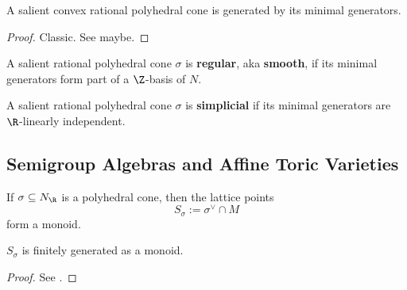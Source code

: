 \begin{lemma}
  \label{1-2-15-cone-hull-min-gen}

  A salient convex rational polyhedral cone is generated by its minimal generators.
\end{lemma}
\begin{proof}

  Classic. See \cite{Oda_1988} maybe.
\end{proof}


\begin{definition}
  \label{1-2-16-reg-cone}

  A salient rational polyhedral cone $\sigma$ is {\bf regular}, aka {\bf smooth}, if its minimal generators form part of a $\Z$-basis of $N$.
\end{definition}


\begin{definition}
  \label{1-2-16-simplicial-cone}

  A salient rational polyhedral cone $\sigma$ is {\bf simplicial} if its minimal generators are $\R$-linearly independent.
\end{definition}


\subsection{Semigroup Algebras and Affine Toric Varieties}


\begin{definition}
  \label{1-2-17-dual-lat-cone}

  If $\sigma \subseteq N_\R$ is a polyhedral cone, then the lattice points
  \[
    S_\sigma := \sigma^\vee \cap M
  \]
  form a monoid.
\end{definition}


\begin{proposition}
  \label{1-2-17-gordan-lemma}

  $S_\sigma$ is finitely generated as a monoid.
\end{proposition}
\begin{proof}

  See \cite{Cox_2011}.
\end{proof}



